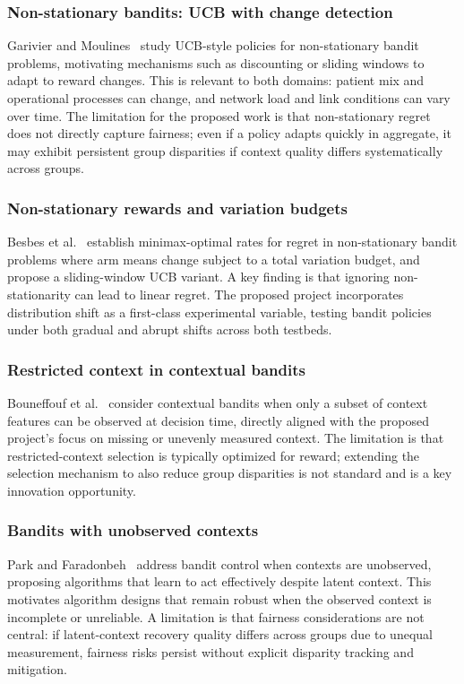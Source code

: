 \documentclass[conference]{IEEEtran}
\begin{document}
\subsubsection{Non-stationary bandits: UCB with change detection}
Garivier and Moulines~\cite{garivier2008ucb} study UCB-style policies for non-stationary
bandit problems, motivating mechanisms such as discounting or sliding windows to adapt to
reward changes. This is relevant to both domains: patient mix and operational processes can
change, and network load and link conditions can vary over time. The limitation for the
proposed work is that non-stationary regret does not directly capture fairness; even if a
policy adapts quickly in aggregate, it may exhibit persistent group disparities if context
quality differs systematically across groups.

\subsubsection{Non-stationary rewards and variation budgets}
Besbes et al.~\cite{besbes2014stochastic} establish minimax-optimal rates for regret in
non-stationary bandit problems where arm means change subject to a total variation budget,
and propose a sliding-window UCB variant. A key finding is that ignoring non-stationarity
can lead to linear regret. The proposed project incorporates distribution shift as a
first-class experimental variable, testing bandit policies under both gradual and abrupt
shifts across both testbeds.

\subsubsection{Restricted context in contextual bandits}
Bouneffouf et al.~\cite{bouneffouf2017context} consider contextual bandits when only a
subset of context features can be observed at decision time, directly aligned with the
proposed project's focus on missing or unevenly measured context. The limitation is that
restricted-context selection is typically optimized for reward; extending the selection
mechanism to also reduce group disparities is not standard and is a key innovation
opportunity.

\subsubsection{Bandits with unobserved contexts}
Park and Faradonbeh~\cite{park2022efficient} address bandit control when contexts are
unobserved, proposing algorithms that learn to act effectively despite latent context.
This motivates algorithm designs that remain robust when the observed context is incomplete
or unreliable. A limitation is that fairness considerations are not central: if latent-context
recovery quality differs across groups due to unequal measurement, fairness risks persist
without explicit disparity tracking and mitigation.
\end{document}
